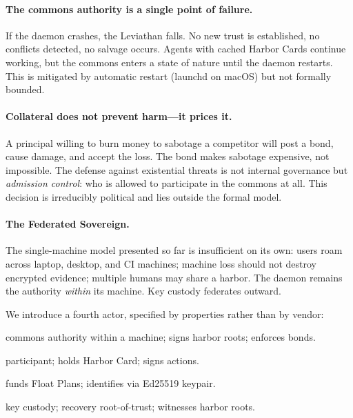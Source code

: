 \documentclass[11pt,a4paper]{article}
\theoremstyle{definition}
\theoremstyle{remark}
\begin{document}
\paragraph{The commons authority is a single point of failure.} If the daemon crashes, the Leviathan falls. No new trust is established, no conflicts detected, no salvage occurs. Agents with cached Harbor Cards continue working, but the commons enters a state of nature until the daemon restarts. This is mitigated by automatic restart (launchd on macOS) but not formally bounded.

\paragraph{Collateral does not prevent harm---it prices it.} A principal willing to burn money to sabotage a competitor will post a bond, cause damage, and accept the loss. The bond makes sabotage expensive, not impossible. The defense against existential threats is not internal governance but \emph{admission control}: who is allowed to participate in the commons at all. This decision is irreducibly political and lies outside the formal model.

\paragraph{The Federated Sovereign.}\label{sec:federated-sovereign} The single-machine model presented so far is insufficient on its own: users roam across laptop, desktop, and CI machines; machine loss should not destroy encrypted evidence; multiple humans may share a harbor. The daemon remains the authority \emph{within} its machine. Key custody federates outward.

We introduce a fourth actor, specified by properties rather than by vendor:
\begin{description}[nosep]
  \item[Daemon] commons authority within a machine; signs harbor roots; enforces bonds.
  \item[Agent] participant; holds Harbor Card; signs actions.
  \item[Principal] funds Float Plans; identifies via Ed25519 keypair.
  \item[\textbf{KMS}] key custody; recovery root-of-trust; witnesses harbor roots.
\end{description}
\end{document}

